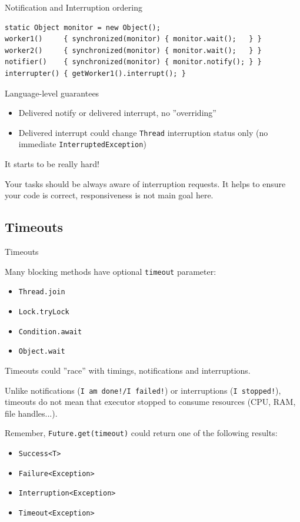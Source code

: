 \begin{frame}[fragile]{Notification and Interruption ordering}

\begin{verbatim}
static Object monitor = new Object();
worker1()     { synchronized(monitor) { monitor.wait();   } }
worker2()     { synchronized(monitor) { monitor.wait();   } }
notifier()    { synchronized(monitor) { monitor.notify(); } }
interrupter() { getWorker1().interrupt(); }
\end{verbatim}

\pause

Language-level guarantees
\begin{itemize}
    \item Delivered notify or delivered interrupt, no ''overriding''
    \item Delivered interrupt could change \texttt{Thread} interruption status only (no immediate \texttt{InterruptedException})
\end{itemize}

\pause
It starts to be really hard!

\pasue
Your tasks should be always aware of interruption requests. It helps to ensure your code is correct, responsiveness is not main goal here.

\end{frame}

\subsection{Timeouts}
\showTOCSub

\begin{frame}{Timeouts}

Many blocking methods have optional \texttt{timeout} parameter:
\begin{itemize}
    \item \texttt{Thread.join}
    \item \texttt{Lock.tryLock}
    \item \texttt{Condition.await}
    \item \texttt{Object.wait}
\end{itemize}

\pause

Timeouts could ''race'' with timings, notifications and interruptions.

\pause

Unlike notifications (\texttt{I am done!/I failed!}) or interruptions (\texttt{I stopped!}), timeouts do not mean that executor stopped to consume resources (CPU, RAM, file handles...).

\pause

Remember, \texttt{Future.get(timeout)} could return one of the following results:
\begin{itemize}
    \item \texttt{Success<T>}
    \item \texttt{Failure<Exception>}
    \item \texttt{Interruption<Exception>}
    \item \texttt{Timeout<Exception>}
\end{itemize}
\end{frame}


